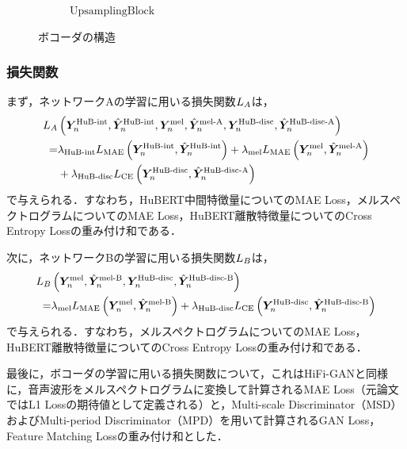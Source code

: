 \begin{figure}[tb]
\begin{subfigure}[b]{0.32\textwidth}
        \caption{$\text{UpsamplingBlock}$}
        \label{sec4:fig:vocoder_main_block}
    \end{subfigure}
    \caption{ボコーダの構造}
    \label{sec4:fig:vocoder}
\end{figure}

\subsubsection{損失関数}
まず，ネットワークAの学習に用いる損失関数$L_{A}$は，
\begin{equation}
    \begin{aligned}
        L_{A} & \left(\bm{Y}^{\text{HuB-int}}_{n}, \hat{\bm{Y}}^{\text{HuB-int}}_{n}, \bm{Y}^{\text{mel}}_{n}, \hat{\bm{Y}}^{\text{mel-A}}_{n}, \bm{Y}^{\text{HuB-disc}}_{n}, \hat{\bm{Y}}^{\text{HuB-disc-A}}_{n}\right)                 \\
        =      & \lambda_{\text{HuB-int}} L_{\text{MAE}}\left(\bm{Y}^{\text{HuB-int}}_{n}, \hat{\bm{Y}}^{\text{HuB-int}}_{n}\right) + \lambda_{\text{mel}} L_{\text{MAE}}\left(\bm{Y}^{\text{mel}}_{n}, \hat{\bm{Y}}^{\text{mel-A}}_{n}\right) \\
               & + \lambda_{\text{HuB-disc}} L_{\text{CE}}\left(\bm{Y}^{\text{HuB-disc}}_{n}, \hat{\bm{Y}}^{\text{HuB-disc-A}}_{n}\right)
    \end{aligned}
\end{equation}
で与えられる．すなわち，HuBERT中間特徴量についてのMAE Loss，メルスペクトログラムについてのMAE Loss，HuBERT離散特徴量についてのCross Entropy Lossの重み付け和である．

次に，ネットワークBの学習に用いる損失関数$L_{B}$は，
\begin{equation}
    \begin{aligned}
        L_{B} & \left(\bm{Y}^{\text{mel}}_{n}, \hat{\bm{Y}}^{\text{mel-B}}_{n}, \bm{Y}^{\text{HuB-disc}}_{n}, \hat{\bm{Y}}^{\text{HuB-disc-B}}_{n}\right)                                                  \\
        =      & \lambda_{\text{mel}} L_{\text{MAE}}\left(\bm{Y}^{\text{mel}}_{n}, \hat{\bm{Y}}^{\text{mel-B}}_{n}\right) + \lambda_{\text{HuB-disc}} L_{\text{CE}}\left(\bm{Y}^{\text{HuB-disc}}_{n}, \hat{\bm{Y}}^{\text{HuB-disc-B}}_{n}\right)
    \end{aligned}
\end{equation}
で与えられる．すなわち，メルスペクトログラムについてのMAE Loss，HuBERT離散特徴量についてのCross Entropy Lossの重み付け和である．

最後に，ボコーダの学習に用いる損失関数について，これはHiFi-GANと同様に，音声波形をメルスペクトログラムに変換して計算されるMAE Loss（元論文ではL1 Lossの期待値として定義される）と，Multi-scale Discriminator（MSD）およびMulti-period Discriminator（MPD）を用いて計算されるGAN Loss，Feature Matching Lossの重み付け和とした．